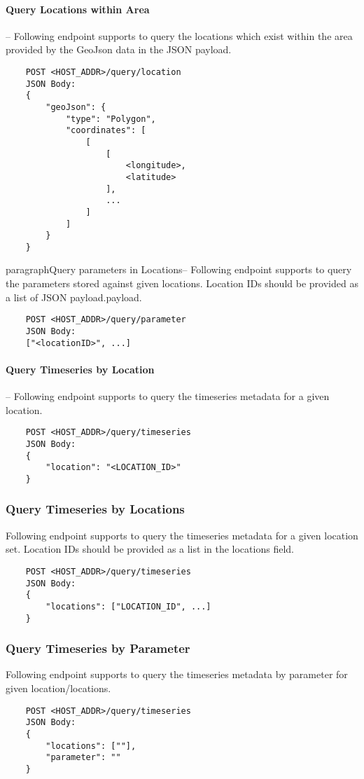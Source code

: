 \paragraph{Query Locations within Area}-- Following endpoint supports to query the locations which exist within the area provided by the GeoJson data in the JSON payload.
\begin{lstlisting}
    POST <HOST_ADDR>/query/location
    JSON Body:
    {
        "geoJson": {
            "type": "Polygon",
            "coordinates": [
                [
                    [
                        <longitude>,
                        <latitude>
                    ],
                    ...
                ]
            ]
        }
    }
\end{lstlisting}

paragraph{Query parameters in Locations}-- Following endpoint supports to query the parameters stored against given locations. Location IDs should be provided as a list of JSON payload.payload.
\begin{lstlisting}
    POST <HOST_ADDR>/query/parameter
    JSON Body:
    ["<locationID>", ...]
\end{lstlisting}

\paragraph{Query Timeseries by Location}-- Following endpoint supports to query the timeseries metadata for a given location.
\begin{lstlisting}
    POST <HOST_ADDR>/query/timeseries
    JSON Body:
    {
        "location": "<LOCATION_ID>"
    }
\end{lstlisting}

\subsubsection{Query Timeseries by Locations}
Following endpoint supports to query the timeseries metadata for a given location set. Location IDs should be provided as a list in the locations field.
\begin{lstlisting}
    POST <HOST_ADDR>/query/timeseries
    JSON Body:
    {
        "locations": ["LOCATION_ID", ...]
    }
\end{lstlisting}

\subsubsection{Query Timeseries by Parameter}
Following endpoint supports to query the timeseries metadata by parameter for given location/locations.
\begin{lstlisting}
    POST <HOST_ADDR>/query/timeseries
    JSON Body:
    {
        "locations": [""],
        "parameter": ""
    }
\end{lstlisting}


